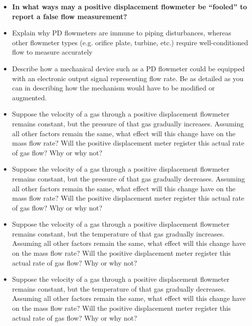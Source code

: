 \begin{itemize}
\item{} {\bf In what ways may a positive displacement flowmeter be ``fooled'' to report a false flow measurement?}
\item{} Explain why PD flowmeters are immune to piping disturbances, whereas other flowmeter types (e.g. orifice plate, turbine, etc.) require well-conditioned flow to measure accurately
\item{} Describe how a mechanical device such as a PD flowmeter could be equipped with an electronic output signal representing flow rate.  Be as detailed as you can in describing how the mechanism would have to be modified or augmented.
\item{} Suppose the velocity of a gas through a positive displacement flowmeter remains constant, but the pressure of that gas gradually increases.  Assuming all other factors remain the same, what effect will this change have on the mass flow rate?  Will the positive displacement meter register this actual rate of gas flow?  Why or why not?
\item{} Suppose the velocity of a gas through a positive displacement flowmeter remains constant, but the pressure of that gas gradually decreases.  Assuming all other factors remain the same, what effect will this change have on the mass flow rate?  Will the positive displacement meter register this actual rate of gas flow?  Why or why not?
\item{} Suppose the velocity of a gas through a positive displacement flowmeter remains constant, but the temperature of that gas gradually increases.  Assuming all other factors remain the same, what effect will this change have on the mass flow rate?  Will the positive displacement meter register this actual rate of gas flow?  Why or why not?
\item{} Suppose the velocity of a gas through a positive displacement flowmeter remains constant, but the temperature of that gas gradually decreases.  Assuming all other factors remain the same, what effect will this change have on the mass flow rate?  Will the positive displacement meter register this actual rate of gas flow?  Why or why not?
\end{itemize}





